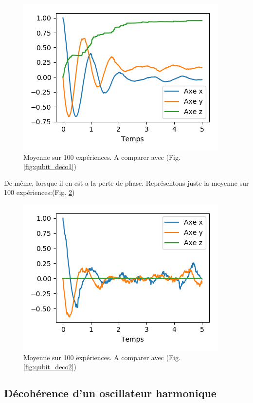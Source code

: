 \documentclass[11pt,a4paper]{article}
\begin{document}
	\begin{figure}
		\centering
		\includegraphics[width=0.7\linewidth]{U_qubit_deco1_100}
		\caption{Moyenne sur 100 expériences. A comparer avec (Fig. \ref{fig:qubit_deco1})}
		\label{fig:u_qubit_deco1_100}
	\end{figure}

	De même, lorsque il en est a la perte de phase. Représentons juste la moyenne sur 100 expériences:(Fig. \ref{fig:u_qubit_deco2_100})
	\begin{figure}
		\centering
		\includegraphics[width=0.7\linewidth]{U_qubit_deco2_100}
		\caption{Moyenne sur 100 expériences. A comparer avec (Fig. \ref{fig:qubit_deco2})}
		\label{fig:u_qubit_deco2_100}
	\end{figure}


	\subsection{Décohérence d'un oscillateur harmonique}
	
\end{document}
